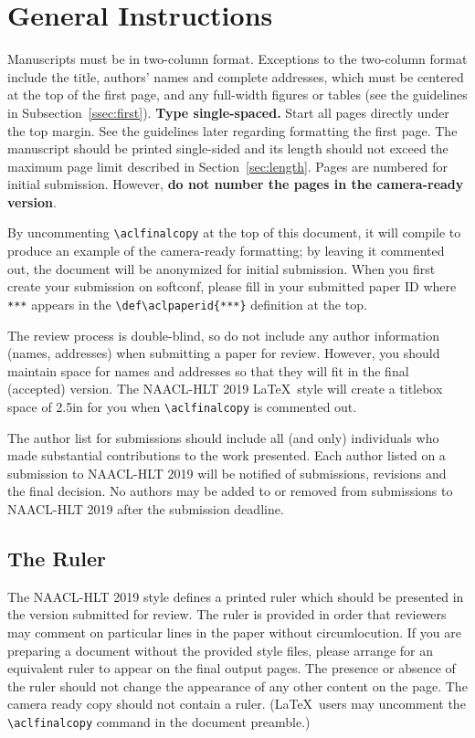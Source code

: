 \documentclass[11pt,a4paper]{article}
\begin{document}
\section{General Instructions}

Manuscripts must be in two-column format.  Exceptions to the
two-column format include the title, authors' names and complete
addresses, which must be centered at the top of the first page, and
any full-width figures or tables (see the guidelines in
Subsection~\ref{ssec:first}). {\bf Type single-spaced.}  Start all
pages directly under the top margin. See the guidelines later
regarding formatting the first page.  The manuscript should be
printed single-sided and its length
should not exceed the maximum page limit described in Section~\ref{sec:length}.
Pages are numbered for  initial submission. However, {\bf do not number the pages in the camera-ready version}.

By uncommenting {\small\verb|\aclfinalcopy|} at the top of this 
 document, it will compile to produce an example of the camera-ready formatting; by leaving it commented out, the document will be anonymized for initial submission.  When you first create your submission on softconf, please fill in your submitted paper ID where {\small\verb|***|} appears in the {\small\verb|\def\aclpaperid{***}|} definition at the top.

The review process is double-blind, so do not include any author information (names, addresses) when submitting a paper for review.  
However, you should maintain space for names and addresses so that they will fit in the final (accepted) version.  The NAACL-HLT 2019 \LaTeX\ style will create a titlebox space of 2.5in for you when {\small\verb|\aclfinalcopy|} is commented out.  

The author list for submissions should include all (and only) individuals who made substantial contributions to the work presented. Each author listed on a submission to NAACL-HLT 2019 will be notified of submissions, revisions and the final decision. No authors may be added to or removed from submissions to NAACL-HLT 2019 after the submission deadline.

\subsection{The Ruler}
The NAACL-HLT 2019 style defines a printed ruler which should be presented in the
version submitted for review.  The ruler is provided in order that
reviewers may comment on particular lines in the paper without
circumlocution.  If you are preparing a document without the provided
style files, please arrange for an equivalent ruler to
appear on the final output pages.  The presence or absence of the ruler
should not change the appearance of any other content on the page.  The
camera ready copy should not contain a ruler. (\LaTeX\ users may uncomment the {\small\verb|\aclfinalcopy|} command in the document preamble.)  
\end{document}
